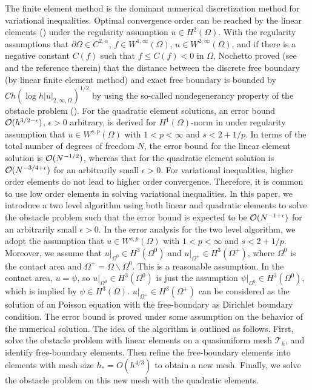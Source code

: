 \documentclass[12pt]{article}
\begin{document}
The finite element method is the dominant numerical discretization method for 
variational inequalities. Optimal convergence order can be reached by the
linear elements (\cite{falk74, glowinski84, wang10, wang11, wang14}) under the regularity assumption 
$u\in H^2(\Omega)$. {\color{red} With the regularity assumptions that $\partial\Omega\in C^{2,\alpha}$, $f\in W^{1,\infty}(\Omega)$, $u\in W^{2,\infty}(\Omega)$, and if there is a negative constant $C(f)$ such that $f\leq C(f) <0$ in $\Omega$, Nochetto proved (see \cite{nochetto86,nochetto15} and the reference therein) that the distance between the discrete free boundary (by linear finite element method) and exact free boundary is bounded by $C h (\log h |u|_{2,\infty,\Omega})^{1/2}$ by using the so-called nondegenerancy property of the obstacle problem (\cite{friedman82}).}  
For the quadratic element solutions, an error bound 
${\cal O}(h^{3/2-\epsilon})$, $\epsilon>0$ arbitrary, is derived for $H^1(\Omega)$-norm 
in \cite{wang02} under regularity assumption that $u\in W^{s,p}(\Omega)$ with 
$1<p<\infty$ and $s<2+1/p$.  In terms of the total number of degrees of freedom $N$, the
error bound for the linear element solution is ${\cal O}(N^{-1/2})$, whereas that for the 
quadratic element solution is ${\cal O}(N^{-3/4+\epsilon})$ for an arbitrarily small $\epsilon>0$.
For variational inequalities, higher order elements do not
lead to higher order convergence.  Therefore, it is common to use low order elements 
in solving variational inequalities.  In this paper, we introduce a two level algorithm
using both linear and quadratic elements to solve the obstacle problem such that the 
error bound is expected to be ${\cal O}(N^{-1+\epsilon})$ for an arbitrarily small $\epsilon>0$. 
In the error analysis for the two level algorithm, we adopt the assumption that 
$u\in W^{s,p}(\Omega)$ with $1<p<\infty$ and $s<2+1/p$. Moreover, we assume that 
$u|_{\Omega^0}\in H^3(\Omega^0)$ and $u|_{\Omega^+}\in H^3(\Omega^+)$, where $\Omega^0$ 
is the contact area and $\Omega^+ = \Omega\backslash \Omega^0$. 
This is a reasonable assumption. In the contact area, $u=\psi$, 
so $u|_{\Omega^0}\in H^3(\Omega^0)$ is just the assumption $\psi|_{\Omega^0}\in H^3(\Omega^0)$, 
which is implied by $\psi\in H^3(\Omega)$. $u|_{\Omega^+}\in H^3(\Omega^+)$ can be 
considered as the solution of an Poisson equation with the free-boundary as Dirichlet 
boundary condition.  The error bound is proved under some assumption on the behavior 
of the numerical solution. The idea of the algorithm is outlined as follows.  First, 
solve the obstacle problem with linear elements on a quasiuniform mesh $\mathcal{T}_h$, 
and identify free-boundary 
elements. Then refine the free-boundary elements into elements with mesh size 
$h_* = O(h^{4/3})$ to obtain a new mesh. Finally, we solve the obstacle problem on 
this new mesh with the quadratic elements. 
\end{document}

